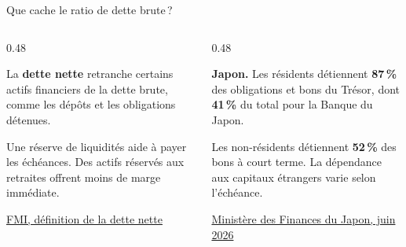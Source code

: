 \documentclass[aspectratio=169]{beamer}
\begin{document}
\begin{frame}{Que cache le ratio de dette brute\,?}
   \begingroup
   \begin{columns}[T,onlytextwidth]
      \begin{column}{0.48\textwidth}
         \begin{bizimplication}
            \small\raggedright
            La \textbf{dette nette} retranche certains actifs financiers de la dette brute, comme les dépôts et les obligations détenues.

            \medskip
            Une réserve de liquidités aide à payer les échéances. Des actifs réservés aux retraites offrent moins de marge immédiate.
         \end{bizimplication}
         {\scriptsize\hfill\href{https://www.imf.org/en/publications/weo/frequently-asked-questions}{FMI, définition de la dette nette}}
      \end{column}
      \begin{column}{0.48\textwidth}
         \begin{bizimplication}
            \small\raggedright
            \textbf{Japon.} Les résidents détiennent \textbf{87\,\%} des obligations et bons du Trésor, dont \textbf{41\,\%} du total pour la Banque du Japon.

            \medskip
            Les non-résidents détiennent \textbf{52\,\%} des bons à court terme. La dépendance aux capitaux étrangers varie selon l’échéance.
         \end{bizimplication}
         {\scriptsize\hfill\href{https://www.mof.go.jp/english/policy/jgbs/reference/Others/holdings01.pdf}{Ministère des Finances du Japon, juin 2026}}
      \end{column}
   \end{columns}
   \endgroup
\end{frame}

\end{document}
